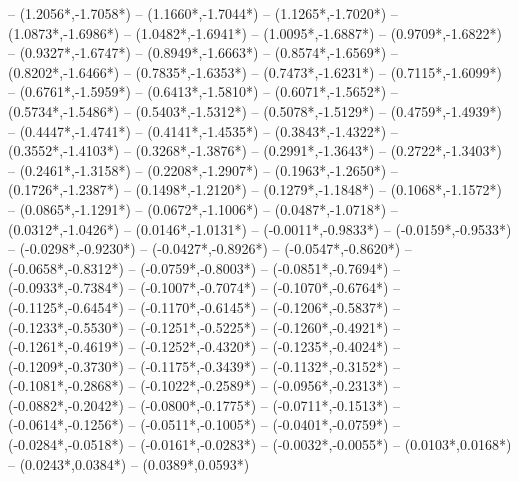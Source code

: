 {	-- ({1.2056*\dx},{-1.7058*\dy})
	-- ({1.1660*\dx},{-1.7044*\dy})
	-- ({1.1265*\dx},{-1.7020*\dy})
	-- ({1.0873*\dx},{-1.6986*\dy})
	-- ({1.0482*\dx},{-1.6941*\dy})
	-- ({1.0095*\dx},{-1.6887*\dy})
	-- ({0.9709*\dx},{-1.6822*\dy})
	-- ({0.9327*\dx},{-1.6747*\dy})
	-- ({0.8949*\dx},{-1.6663*\dy})
	-- ({0.8574*\dx},{-1.6569*\dy})
	-- ({0.8202*\dx},{-1.6466*\dy})
	-- ({0.7835*\dx},{-1.6353*\dy})
	-- ({0.7473*\dx},{-1.6231*\dy})
	-- ({0.7115*\dx},{-1.6099*\dy})
	-- ({0.6761*\dx},{-1.5959*\dy})
	-- ({0.6413*\dx},{-1.5810*\dy})
	-- ({0.6071*\dx},{-1.5652*\dy})
	-- ({0.5734*\dx},{-1.5486*\dy})
	-- ({0.5403*\dx},{-1.5312*\dy})
	-- ({0.5078*\dx},{-1.5129*\dy})
	-- ({0.4759*\dx},{-1.4939*\dy})
	-- ({0.4447*\dx},{-1.4741*\dy})
	-- ({0.4141*\dx},{-1.4535*\dy})
	-- ({0.3843*\dx},{-1.4322*\dy})
	-- ({0.3552*\dx},{-1.4103*\dy})
	-- ({0.3268*\dx},{-1.3876*\dy})
	-- ({0.2991*\dx},{-1.3643*\dy})
	-- ({0.2722*\dx},{-1.3403*\dy})
	-- ({0.2461*\dx},{-1.3158*\dy})
	-- ({0.2208*\dx},{-1.2907*\dy})
	-- ({0.1963*\dx},{-1.2650*\dy})
	-- ({0.1726*\dx},{-1.2387*\dy})
	-- ({0.1498*\dx},{-1.2120*\dy})
	-- ({0.1279*\dx},{-1.1848*\dy})
	-- ({0.1068*\dx},{-1.1572*\dy})
	-- ({0.0865*\dx},{-1.1291*\dy})
	-- ({0.0672*\dx},{-1.1006*\dy})
	-- ({0.0487*\dx},{-1.0718*\dy})
	-- ({0.0312*\dx},{-1.0426*\dy})
	-- ({0.0146*\dx},{-1.0131*\dy})
	-- ({-0.0011*\dx},{-0.9833*\dy})
	-- ({-0.0159*\dx},{-0.9533*\dy})
	-- ({-0.0298*\dx},{-0.9230*\dy})
	-- ({-0.0427*\dx},{-0.8926*\dy})
	-- ({-0.0547*\dx},{-0.8620*\dy})
	-- ({-0.0658*\dx},{-0.8312*\dy})
	-- ({-0.0759*\dx},{-0.8003*\dy})
	-- ({-0.0851*\dx},{-0.7694*\dy})
	-- ({-0.0933*\dx},{-0.7384*\dy})
	-- ({-0.1007*\dx},{-0.7074*\dy})
	-- ({-0.1070*\dx},{-0.6764*\dy})
	-- ({-0.1125*\dx},{-0.6454*\dy})
	-- ({-0.1170*\dx},{-0.6145*\dy})
	-- ({-0.1206*\dx},{-0.5837*\dy})
	-- ({-0.1233*\dx},{-0.5530*\dy})
	-- ({-0.1251*\dx},{-0.5225*\dy})
	-- ({-0.1260*\dx},{-0.4921*\dy})
	-- ({-0.1261*\dx},{-0.4619*\dy})
	-- ({-0.1252*\dx},{-0.4320*\dy})
	-- ({-0.1235*\dx},{-0.4024*\dy})
	-- ({-0.1209*\dx},{-0.3730*\dy})
	-- ({-0.1175*\dx},{-0.3439*\dy})
	-- ({-0.1132*\dx},{-0.3152*\dy})
	-- ({-0.1081*\dx},{-0.2868*\dy})
	-- ({-0.1022*\dx},{-0.2589*\dy})
	-- ({-0.0956*\dx},{-0.2313*\dy})
	-- ({-0.0882*\dx},{-0.2042*\dy})
	-- ({-0.0800*\dx},{-0.1775*\dy})
	-- ({-0.0711*\dx},{-0.1513*\dy})
	-- ({-0.0614*\dx},{-0.1256*\dy})
	-- ({-0.0511*\dx},{-0.1005*\dy})
	-- ({-0.0401*\dx},{-0.0759*\dy})
	-- ({-0.0284*\dx},{-0.0518*\dy})
	-- ({-0.0161*\dx},{-0.0283*\dy})
	-- ({-0.0032*\dx},{-0.0055*\dy})
	-- ({0.0103*\dx},{0.0168*\dy})
	-- ({0.0243*\dx},{0.0384*\dy})
	-- ({0.0389*\dx},{0.0593*\dy})
}
